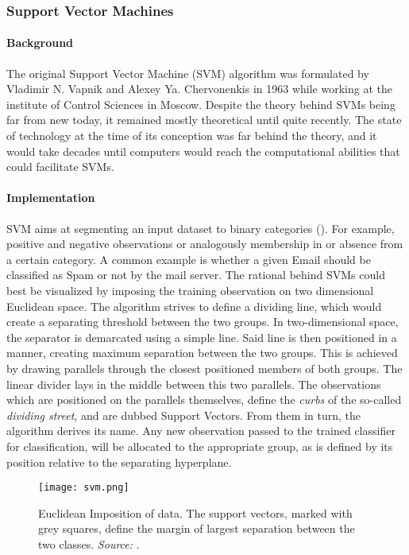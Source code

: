 \subsubsection{Support Vector Machines}
	\label{svm}
	
	\paragraph{Background}
	The original Support Vector Machine (SVM) algorithm was formulated by Vladimir N. Vapnik and Alexey Ya. Chervonenkis in 1963 while working at the institute of Control Sciences in Moscow. Despite the theory behind SVMs being far from new today, it remained mostly theoretical until quite recently. The state of technology at the time of its conception was far behind the theory, and it would take decades until computers would reach the computational abilities that could facilitate SVMs.
	
	\paragraph{Implementation}
	SVM aims at segmenting an input dataset to binary categories (\cite{SVM_burges1998tutorial}). For example, positive and negative observations or analogously membership in or absence from a certain category. A common example is whether a given Email should be classified as Spam or not by the mail server. The rational behind SVMs could best be visualized by imposing the training observation on two dimensional Euclidean space. The algorithm strives to define a dividing line, which would create a separating threshold between the two groups. In two-dimensional space, the separator is demarcated using a simple line. Said line is then positioned in a manner, creating maximum separation between the two groups. This is achieved by drawing parallels through the closest positioned members of both groups. The linear divider lays in the middle between this two parallels. The observations which are positioned on the parallels themselves, define the \textit{curbs} of the so-called \textit{dividing street}, and are dubbed Support Vectors. From them in turn, the algorithm derives its name. Any new observation passed to the trained classifier for classification, will be allocated to the appropriate group, as is defined by its position relative to the separating hyperplane. 
	
	\begin{figure}[h]
		\centering
		\captionsetup{width=0.8\textwidth}
		\texttt{[image: svm.png]}
		\caption[SVM in Euclidean Space]{
			\footnotesize{
				Euclidean Imposition of data. The support vectors, marked with grey squares, define the margin of largest separation between the two classes. \textit{Source:} \cite{SVM_cortes1995support}.
			}
		} 
	\end{figure}

